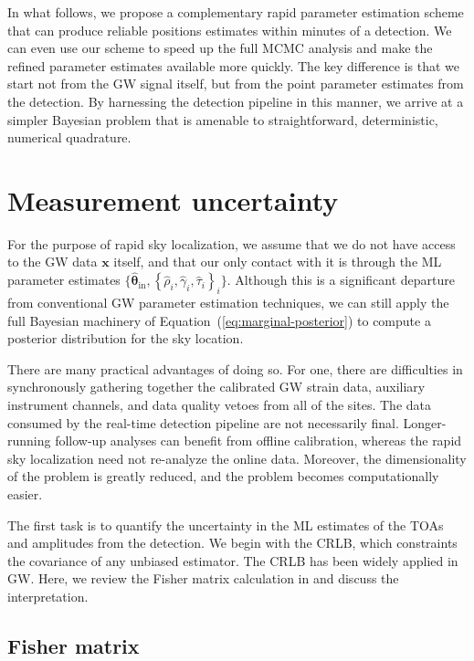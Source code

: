 \documentclass{iopart}
\let\oldmarginpar\marginpar
\renewcommand\marginpar[1]{\-\oldmarginpar[\raggedleft\footnotesize #1]%
{\raggedright\footnotesize #1}}
\begin{document}
In what follows, we propose a complementary rapid parameter estimation scheme that can produce reliable positions estimates within minutes of a detection. We can even use our scheme to speed up the full \ac{MCMC} analysis and make the refined parameter estimates available more quickly. The key difference is that we start not from the \ac{GW} signal itself, but from the point parameter estimates from the detection. By harnessing the detection pipeline in this manner, we arrive at a simpler Bayesian problem that is amenable to straightforward, deterministic, numerical quadrature.

\section{Measurement uncertainty}

For the purpose of rapid sky localization, we assume that we do not have access to the \ac{GW} data $\mathbf{x}$ itself, and that our only contact with it is through the ML parameter estimates $\{\hat{\boldsymbol\theta}_\mathrm{in}, \left\{ \hat\rho_i, \hat\gamma_i, \hat\tau_i \right\}_i\}$. Although this is a significant departure from conventional GW parameter estimation techniques, we can still apply the full Bayesian machinery of Equation~(\ref{eq:marginal-posterior}) to compute a posterior distribution for the sky location.

\marginpar{This is poorly worded.}%
%
There are many practical advantages of doing so. For one, there are difficulties in synchronously gathering together the calibrated GW strain data, auxiliary instrument channels, and data quality vetoes from all of the sites. The data consumed by the real\nobreakdashes-time detection pipeline are not necessarily final. Longer\nobreakdashes-running follow\nobreakdashes-up analyses can benefit from offline calibration, whereas the rapid sky localization need not re\nobreakdashes-analyze the online data. Moreover, the dimensionality of the problem is greatly reduced, and the problem becomes computationally easier.

The first task is to quantify the uncertainty in the \ac{ML} estimates of the \acp{TOA} and amplitudes from the detection. We begin with the \ac{CRLB}, which constraints the covariance of any unbiased estimator. The \ac{CRLB} has been widely applied in \ac{GW}. Here, we review the Fisher matrix calculation in \cite{fairhurst:2009} and discuss the interpretation.

\subsection{Fisher matrix}
\end{document}
